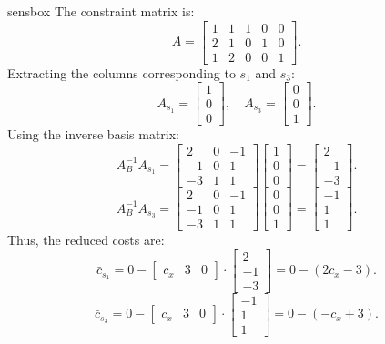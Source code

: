 \begin{steppanel}{sensbox}
The constraint matrix is:
\[
    A = \begin{bmatrix}
    1 & 1 & 1 & 0 & 0 \\
    2 & 1 & 0 & 1 & 0 \\
    1 & 2 & 0 & 0 & 1
    \end{bmatrix}.
\]
Extracting the columns corresponding to \( s_1 \) and \( s_3 \):
\[
    A_{s_1} = \begin{bmatrix} 1 \\ 0 \\ 0 \end{bmatrix}, \quad
    A_{s_3} = \begin{bmatrix} 0 \\ 0 \\ 1 \end{bmatrix}.
\]
Using the inverse basis matrix:
\[
    A_B^{-1} A_{s_1} =
    \begin{bmatrix}
    2 & 0 & -1 \\
    -1 & 0 & 1 \\
    -3 & 1 & 1
    \end{bmatrix}
    \begin{bmatrix} 1 \\ 0 \\ 0 \end{bmatrix} =
    \begin{bmatrix} 2 \\ -1 \\ -3 \end{bmatrix}.
\]
\[
    A_B^{-1} A_{s_3} =
    \begin{bmatrix}
    2 & 0 & -1 \\
    -1 & 0 & 1 \\
    -3 & 1 & 1
    \end{bmatrix}
    \begin{bmatrix} 0 \\ 0 \\ 1 \end{bmatrix} =
    \begin{bmatrix} -1 \\ 1 \\ 1 \end{bmatrix}.
\]
Thus, the reduced costs are:
\[
    \bar{c}_{s_1} = 0 - \begin{bmatrix} c_x & 3 & 0 \end{bmatrix} \cdot \begin{bmatrix} 2 \\ -1 \\ -3 \end{bmatrix}
    = 0 - (2c_x - 3).
\]
\[
    \bar{c}_{s_3} = 0 - \begin{bmatrix} c_x & 3 & 0 \end{bmatrix} \cdot \begin{bmatrix} -1 \\ 1 \\ 1 \end{bmatrix}
    = 0 - (-c_x + 3).
\]
\end{steppanel}

